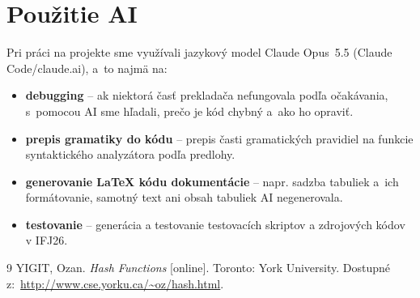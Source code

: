 \documentclass[11pt,a4paper]{article}
\begin{document}
\section{Použitie AI}
Pri práci na projekte sme využívali jazykový model Claude Opus~5.5 (Claude Code/claude.ai), a~to najmä na:
\begin{itemize}
  \item \textbf{debugging} -- ak niektorá časť prekladača nefungovala podľa očakávania, s~pomocou AI sme hľadali, prečo je kód chybný a~ako ho opraviť.
  \item \textbf{prepis gramatiky do kódu} -- prepis časti gramatických pravidiel na funkcie syntaktického analyzátora podľa predlohy.
  \item \textbf{generovanie \LaTeX{} kódu dokumentácie} -- napr. sadzba tabuliek a~ich formátovanie, samotný text ani obsah tabuliek AI negenerovala.
  \item \textbf{testovanie} -- generácia a testovanie testovacích skriptov a zdrojových kódov v IFJ26.
\end{itemize}

\begin{thebibliography}{9}
    YIGIT, Ozan. \textit{Hash Functions} [online]. Toronto: York University. 
    Dostupné z:~\url{http://www.cse.yorku.ca/~oz/hash.html}.
\end{thebibliography}
\end{document}
